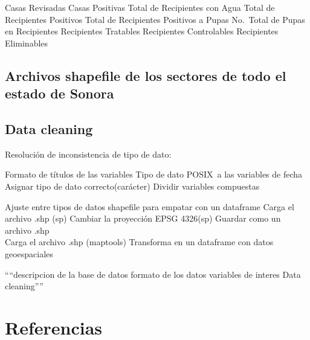 \documentclass[
  letterpaper,
  twocolumn,
  landscape]{report}
\begin{document}
Casas Revisadas Casas Positivas Total de Recipientes con Agua Total de
Recipientes Positivos Total de Recipientes Positivos a Pupas No.~Total
de Pupas en Recipientes Recipientes Tratables Recipientes Controlables
Recipientes Eliminables

\section{Archivos shapefile de los sectores de todo el estado de
Sonora}\label{archivos-shapefile-de-los-sectores-de-todo-el-estado-de-sonora}

\section{Data cleaning}\label{data-cleaning}

Resolución de inconsistencia de tipo de dato:

Formato de títulos de las variables Tipo de dato POSIX~a las variables
de fecha Asignar tipo de dato correcto(carácter) Dividir variables
compuestas

Ajuste entre tipos de datos shapefile para empatar con un dataframe
Carga el archivo .shp (sp) Cambiar la proyección EPSG 4326(sp) Guardar
como un archivo .shp\\
Carga el archivo .shp (maptools) Transforma en un dataframe con datos
geoespaciales

````descripcion de la base de datos formato de los datos variables de
interes Data cleaning''''


\chapter{Referencias}\label{referencias}
\end{document}
